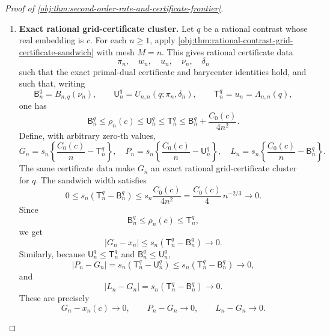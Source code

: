 \documentclass[11pt]{article}
\begin{document}
\begin{proof}[Proof of \cref{obj:thm:second-order-rate-and-certificate-frontier}]
\begin{enumerate}
\item \textbf{Exact rational grid-certificate cluster.}
Let \(q\) be a rational contrast whose real embedding is \(c\). For each \(n\ge1\), apply \cref{obj:thm:rational-contrast-grid-certificate-sandwich} with mesh \(M=n\). This gives rational certificate data
\[
\pi_n,\quad w_n,\quad u_n,\quad \nu_n,\quad \delta_n
\]
such that the exact primal-dual certificate and barycenter identities hold, and such that, writing
\[
\mathsf B_n^q=B_{n,q}(\nu_n),
\qquad
\mathsf U_n^q=U_{n,n}(q;\pi_n,\delta_n),
\qquad
\mathsf T_n^q=u_n=\Lambda_{n,n}(q),
\]
one has
\[
\mathsf B_n^q
\le
\rho_n(c)
\le
\mathsf U_n^q
\le
\mathsf T_n^q
\le
\mathsf B_n^q+\frac{C_0(c)}{4n^2}.
\]
Define, with arbitrary zero-th values,
\[
G_n=s_n\left\{\frac{C_0(c)}{n}-\mathsf T_n^q\right\},
\quad
P_n=s_n\left\{\frac{C_0(c)}{n}-\mathsf U_n^q\right\},
\quad
L_n=s_n\left\{\frac{C_0(c)}{n}-\mathsf B_n^q\right\}.
\]
The same certificate data make \(G_n\) an exact rational grid-certificate cluster for \(q\). The sandwich width satisfies
\[
0\le
s_n(\mathsf T_n^q-\mathsf B_n^q)
\le
s_n\frac{C_0(c)}{4n^2}
=
\frac{C_0(c)}4\,n^{-2/3}
\longrightarrow0.
\]
Since
\[
\mathsf B_n^q\le \rho_n(c)\le \mathsf T_n^q,
\]
we get
\[
|G_n-x_n|
\le
s_n(\mathsf T_n^q-\mathsf B_n^q)\to0.
\]
Similarly, because \(\mathsf U_n^q\le\mathsf T_n^q\) and \(\mathsf B_n^q\le\mathsf U_n^q\),
\[
|P_n-G_n|
=
s_n(\mathsf T_n^q-\mathsf U_n^q)
\le
s_n(\mathsf T_n^q-\mathsf B_n^q)\to0,
\]
and
\[
|L_n-G_n|
=
s_n(\mathsf T_n^q-\mathsf B_n^q)\to0.
\]
These are precisely
\[
G_n-x_n(c)\to0,\qquad
P_n-G_n\to0,\qquad
L_n-G_n\to0.
\] %


\end{enumerate}
\end{proof}
\end{document}
